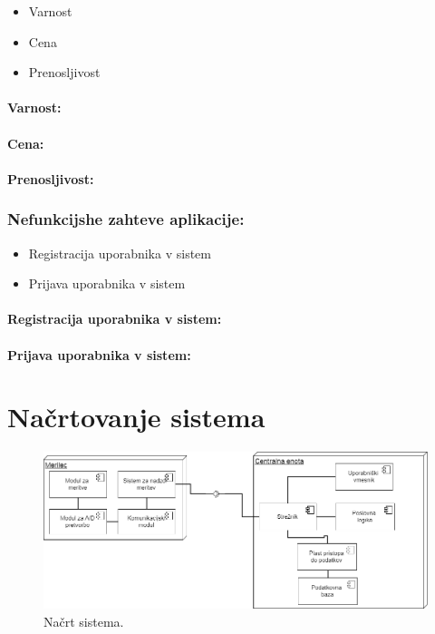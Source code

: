 \documentclass[12pt,a4paper,titlepage,openany]{report}
\begin{document}
\begin{itemize}
\item Varnost
\item Cena
\item Prenosljivost
\end{itemize}

\subsubsection{Varnost:}
\subsubsection{Cena:}
\subsubsection{Prenosljivost:}

\subsection{Nefunkcijshe zahteve aplikacije:}

\begin{itemize}

\item Registracija uporabnika v sistem
\item Prijava uporabnika v sistem
\end{itemize}

\subsubsection{Registracija uporabnika v sistem:}
\subsubsection{Prijava uporabnika v sistem:}




\chapter{Načrtovanje sistema}
\thispagestyle{fancy}

\begin{figure}[H]
\begin{center}
\includegraphics[width=1\linewidth]{Slike/NacrtSistema.png}
\end{center}
\caption{Načrt sistema.}\label{slika:NacrtSistema}
\end{figure}
\end{document}
